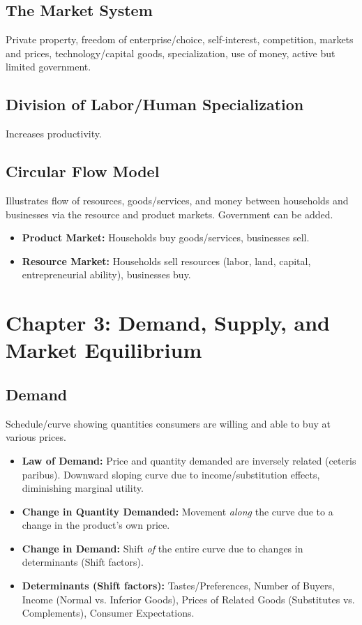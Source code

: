 \documentclass{article}
\begin{document}
\subsection*{The Market System}
Private property, freedom of enterprise/choice, self-interest, competition, markets and prices, technology/capital goods, specialization, use of money, active but limited government.

\subsection*{Division of Labor/Human Specialization}
Increases productivity.

\subsection*{Circular Flow Model}
Illustrates flow of resources, goods/services, and money between households and businesses via the resource and product markets. Government can be added.
\begin{itemize}
    \item \textbf{Product Market:} Households buy goods/services, businesses sell.
    \item \textbf{Resource Market:} Households sell resources (labor, land, capital, entrepreneurial ability), businesses buy.
\end{itemize}

\section*{Chapter 3: Demand, Supply, and Market Equilibrium}

\subsection*{Demand}
Schedule/curve showing quantities consumers are willing and able to buy at various prices.
\begin{itemize}
    \item \textbf{Law of Demand:} Price and quantity demanded are inversely related (ceteris paribus). Downward sloping curve due to income/substitution effects, diminishing marginal utility.
    \item \textbf{Change in Quantity Demanded:} Movement \textit{along} the curve due to a change in the product's own price.
    \item \textbf{Change in Demand:} Shift \textit{of} the entire curve due to changes in determinants (Shift factors).
    \item \textbf{Determinants (Shift factors):} Tastes/Preferences, Number of Buyers, Income (Normal vs. Inferior Goods), Prices of Related Goods (Substitutes vs. Complements), Consumer Expectations.
\end{itemize}
\end{document}
